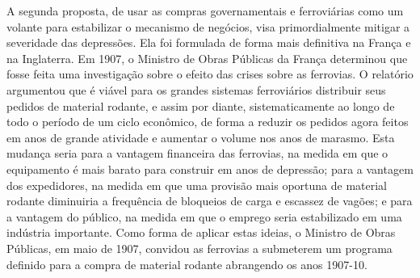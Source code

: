 \documentclass[12pt]{article}
\begin{document}
A segunda proposta, de usar as compras governamentais e ferroviárias como um volante para estabilizar o mecanismo de negócios, visa primordialmente mitigar a severidade das depressões. Ela foi formulada de forma mais definitiva na França e na Inglaterra. Em 1907, o Ministro de Obras Públicas da França determinou que fosse feita uma investigação sobre o efeito das crises sobre as ferrovias. O relatório argumentou que é viável para os grandes sistemas ferroviários distribuir seus pedidos de material rodante, e assim por diante, sistematicamente ao longo de todo o período de um ciclo econômico, de forma a reduzir os pedidos agora feitos em anos de grande atividade e aumentar o volume nos anos de marasmo. Esta mudança seria para a vantagem financeira das ferrovias, na medida em que o equipamento é mais barato para construir em anos de depressão; para a vantagem dos expedidores, na medida em que uma provisão mais oportuna de material rodante diminuiria a frequência de bloqueios de carga e escassez de vagões; e para a vantagem do público, na medida em que o emprego seria estabilizado em uma indústria importante. Como forma de aplicar estas ideias, o Ministro de Obras Públicas, em maio de 1907, convidou as ferrovias a submeterem um programa definido para a compra de material rodante abrangendo os anos 1907-10.
\end{document}
